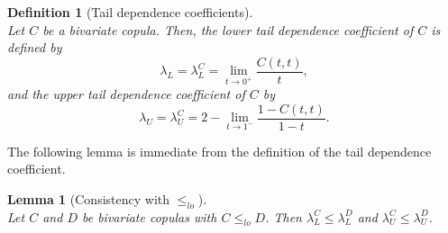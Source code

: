 \documentclass{article}
\newtheorem{lemma}[theorem]{Lemma}
\newtheorem{definition}[theorem]{Definition}
\begin{document}
\begin{definition}[Tail dependence coefficients]~\\
    Let $C$ be a bivariate copula.
    Then, the \emph{lower tail dependence coefficient} of $C$ is defined by
    \[
        \lambda_L = \lambda_L^C=\lim _{t \rightarrow 0^{+}} \frac{C(t, t)}{t}
    ,\]
    and the \emph{upper tail dependence coefficient} of $C$ by
    \[
        \lambda_U = \lambda_U^C =2-\lim _{t \rightarrow 1^{-}} \frac{1-C(t, t)}{1-t}
    .\]
\end{definition}
The following lemma is immediate from the definition of the tail dependence coefficient.

\begin{lemma}[Consistency with \(\leq_{lo}\)]\label{lem:tail_consistent_with_lo}~\\
    Let $C$ and $D$ be bivariate copulas with $C\leq_{lo}D$.
    Then $\lambda_L^C\leq \lambda_L^D$ and $\lambda_U^C\leq \lambda_U^D$.
\end{lemma}
\end{document}
